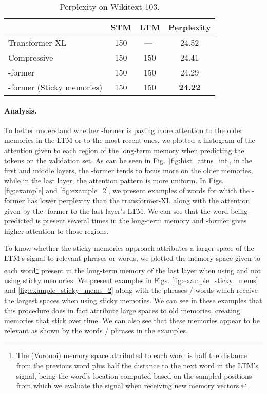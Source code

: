 \documentclass[11pt]{article}
\begin{document}
\begin{table}[t]
\vspace{\baselineskip}
\centering \small
\setlength{\tabcolsep}{1ex}
\begin{tabular}{lccc}
\toprule
& STM & LTM & Perplexity \\
\midrule
Transformer-XL & 150 & ---- & 24.52 \\
Compressive & 150 & 150 & 24.41 \\
-former & 150 & 150 & 24.29 \\
-former (Sticky memories) & 150 & 150 & \textbf{24.22} \\
\bottomrule
\end{tabular}
\caption{Perplexity on Wikitext-103. }
\label{table:wt-103}
\end{table}

\paragraph{Analysis. }
\label{sec:analysis_lm}


To better understand whether -former is paying more attention to the older memories in the LTM or to the most recent ones, we plotted a histogram of the attention given to each region of the long-term memory when predicting the tokens on the validation set. As can be seen in Fig.~\ref{fig:hist_attns_inf}, in the first  and middle layers, the -former tends to focus more on the older memories, while in the last layer, the attention pattern is more uniform. 
In Figs. \ref{fig:example} and \ref{fig:example_2}, we present examples of words for which the -former has lower perplexity than the transformer-XL along with the attention given by the -former to the last layer's LTM. We can see that the word being predicted is present several times in the long-term memory and -former gives higher attention to those regions.

To know whether the sticky memories approach attributes a larger space of the LTM's signal to relevant phrases or words, we plotted the memory space given to each word\footnote{The (Voronoi) memory space attributed to each word is half the distance from the previous word plus half the distance to the next word in the LTM's signal, being the word's location computed based on the sampled positions from which we evaluate the signal when receiving new memory vectors.} 
present in the long-term memory of the last layer when using and not using sticky memories. We present examples in Figs. \ref{fig:example_sticky_mems} and \ref{fig:example_sticky_mems_2} along with the phrases / words which receive the largest spaces when using sticky memories. We can see in these examples that this procedure does in fact attribute large spaces to old memories, creating memories that stick over time. We can also see that these memories appear to be relevant as shown by the words / phrases in the examples.
\end{document}
